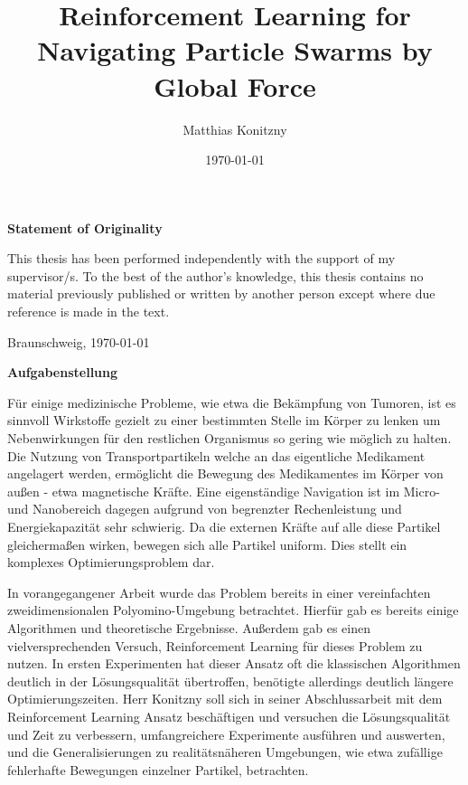 \documentclass[%
  a4paper,%
  11pt,%
  style=print,
  blue,%
  bibliography=totoc,
  nexus,
  lnum,
  extramargin,
  table
  ]{tubsbook}
\title{Reinforcement Learning for Navigating Particle Swarms by Global Force}
\author{Matthias Konitzny}
\date{\today}
\begin{document}
\maketitle

\frontmatter

\cleardoublepage


\thispagestyle{plain} %
\vspace*{7cm}
\centerline{\bfseries Statement of Originality}
\vspace*{1em}
\noindent
This thesis has been performed independently with the support of my supervisor/s.
To the best of the author's knowledge, this thesis contains no material previously
published or written by another person except where due reference is made in the text.

\par
  \bigskip\noindent Braunschweig, \today \par
  \vspace*{10mm}
  \hfill\hrulefill
\cleardoublepage

\thispagestyle{plain} %
\centerline{\bfseries Aufgabenstellung}
\vspace*{1em}
\noindent
Für einige medizinische Probleme, wie etwa die Bekämpfung von Tumoren, ist es sinnvoll Wirkstoffe gezielt zu einer bestimmten Stelle im Körper zu lenken um Nebenwirkungen für den restlichen Organismus so gering wie möglich zu halten. Die Nutzung von Transportpartikeln welche an das eigentliche Medikament angelagert werden, ermöglicht die Bewegung des Medikamentes im Körper von außen - etwa magnetische Kräfte. Eine eigenständige Navigation ist im Micro- und Nanobereich dagegen aufgrund von begrenzter Rechenleistung und Energiekapazität sehr schwierig. Da die externen Kräfte auf alle diese Partikel gleichermaßen wirken, bewegen sich alle Partikel uniform. Dies stellt ein komplexes Optimierungsproblem dar.

In vorangegangener Arbeit wurde das Problem bereits in einer vereinfachten zweidimensionalen Polyomino-Umgebung betrachtet. Hierfür gab es bereits einige Algorithmen und theoretische Ergebnisse. Außerdem gab es einen vielversprechenden Versuch, Reinforcement Learning für dieses Problem zu nutzen. In ersten Experimenten hat dieser Ansatz oft die klassischen Algorithmen deutlich in der Lösungsqualität übertroffen, benötigte allerdings deutlich längere Optimierungszeiten. Herr Konitzny soll sich in seiner Abschlussarbeit mit dem Reinforcement Learning Ansatz beschäftigen und versuchen die Lösungsqualität und Zeit zu verbessern, umfangreichere Experimente ausführen und auswerten, und die Generalisierungen zu realitätsnäheren Umgebungen, wie etwa zufällige fehlerhafte Bewegungen einzelner Partikel, betrachten.
\cleardoublepage
\end{document}
